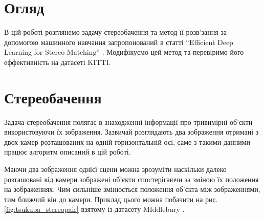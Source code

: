 \documentclass[11pt]{article}
\theoremstyle{definition}
\begin{document}
\tableofcontents

\newpage

\section{Огляд}
В цій роботі розглянемо задачу стереобачення та метод її розв’зання за допомогою машинного навчання запропонований в статті “Efficient Deep Learning for Stereo Matching” \cite{deepLearningForStereo}. Модифікуємо цей метод та перевіримо його еффективність на датасеті KITTI.

\section{Стереобачення}
Задача стереобачення полягає в знаходженні інформації про тривимірні об'єкти використовуючи їх зображення. Зазвичай розглядають два зображення отримані з двох камер розташованих на одній горизонтальній осі, саме з такими данними працює алгоритм описаний в цій роботі.

Маючи два зображення однїєї сцени можна зрозуміти наскільки далеко розташовані від камери зображені об'єкти спостерігаючи за зміною їх положення на зображеннях. Чим сильніше змінюється положення об'єкта між зображеннями, тим ближчий він до камери. Приклад цього можна побачити на рис. \ref{fig:tsukuba_stereopair} взятому із датасету MIddlebury \cite{middlebury2001dataset}.
\end{document}
